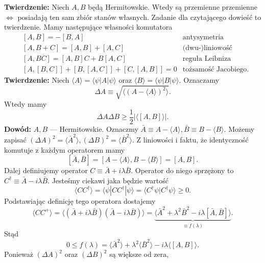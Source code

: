 \textbf{Twierdzenie:} Niech $A, B$ będą Hermitowskie.
Wtedy są przemienne przemienne $\iff$ posiadają ten sam zbiór stanów własnych.
Zadanie dla czytającego dowieść to twierdzenie.
Mamy następujące własności komutatora
\begin{equation}
	\begin{aligned}
        &[A, B] = - [B, A] & \text{antysymetria} \\
        &[A, B+C] = [A, B] + [A, C] & \text{(dwu-)liniowość}\\
        &[A, BC] = [A,B]C + B[A,C] & \text{reguła Leibniza}\\
        &[A,[B,C]] + [B,[A,C]] + [C,[A,B]] = 0 & \text{tożsamość Jacobiego.}
	\end{aligned}
\end{equation}
\textbf{Twierdzenie:} Niech $\langle A\rangle=\langle\psi| A|\psi\rangle$ oraz
$\langle B\rangle=\langle\psi| B|\psi\rangle$.
Oznaczamy
\begin{equation*}
    \Delta A \equiv \sqrt{\langle (A - \langle A \rangle)^2\rangle}.
\end{equation*}
Wtedy mamy $$\Delta A \Delta B \geq \frac12 |\langle [A, B] \rangle|.$$
\textbf{Dowód:} $A, B$ --- Hermitowskie.
Oznaczmy $\bar{A} \equiv A-\langle A\rangle,  \bar{B} \equiv B-\langle B\rangle $. 
Możemy zapisać $ (\Delta A)^{2}=\langle\bar{A}^{2}\rangle, 
(\Delta B)^{2}=\langle\bar{B}^{2}\rangle $. 
Z liniowości i faktu, że identyczność komutuje z każdym operatorem mamy
$$ [\bar{A}, \bar{B}]=[A-\langle A\rangle, B-\langle B\rangle]=[A, B].$$ 
Dalej definiujemy operator $C \equiv \bar{A}+i \lambda \bar{B}$.
Operator do niego sprzężony to $C^\dagger \equiv \bar{A}-i \lambda \bar{B}$. 
Jesteśmy ciekawi jaka będzie wartość
$$  \langle C C^{\dagger}\rangle=\langle\psi| C C^{\dagger}|\psi\rangle= \langle C^{\dagger} \psi|C^{\dagger} \psi\rangle \geqslant 0  .$$
Podstawiając definicję tego operatora dostajemy
\begin{equation*}
	\langle C C^{+}\rangle =
        \langle (\bar{A}+ i \lambda \bar{B}) (\bar{A}-i \lambda \bar{B})\rangle
        =\underbrace{\langle \bar A^{2}+\lambda^{2} \bar{B}^{2}-i\lambda[\bar{A}, \bar{B}]\rangle}_{\equiv f(\lambda)}.
\end{equation*}
Stąd
\begin{equation*}
	0 \leq f(\lambda) = \langle\bar{A}^{2}\rangle + \lambda^{2}\langle
        \bar B^{2}\rangle - i\lambda\langle[A, B]\rangle.
\end{equation*}
Ponieważ $(\Delta A)^2$ oraz $(\Delta B)^2$ są większe od zera,
